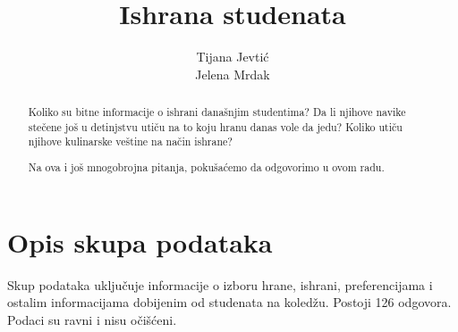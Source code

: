 \documentclass[12pt,a4paper]{article}
\title{Ishrana studenata}
\author{Tijana Jevti\' c \\ Jelena Mrdak}
\begin{document}
\maketitle
\begin{abstract}
Koliko su bitne informacije o ishrani dana\v snjim studentima? Da li njihove navike ste\v cene jo\v s u detinjstvu uti\v cu na to koju hranu danas vole da jedu? Koliko uti\v cu njihove kulinarske ve\v stine na na\v cin ishrane?

Na ova i jo\v s mnogobrojna pitanja, poku\v sa\' cemo da odgovorimo u ovom radu.
\end{abstract}

\tableofcontents

\section{Opis skupa podataka}
Skup podataka uklju\v cuje informacije o izboru hrane, ishrani, preferencijama i ostalim informacijama dobijenim od studenata na koled\v zu. Postoji 126 odgovora. Podaci su ravni i nisu o\v ci\v s\' ceni.
\end{document}
